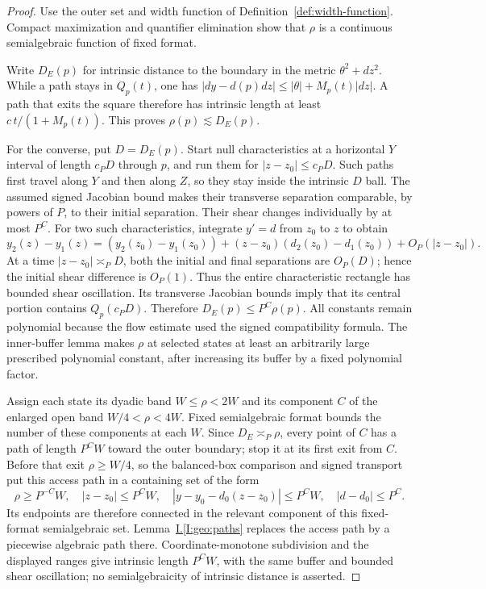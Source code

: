 \documentclass[11pt]{amsart}
\theoremstyle{definition}
\theoremstyle{remark}
\numberwithin{equation}{section}
\newcommand{\partIref}[1]{\hyperref[I:#1]{I.\ref*{I:#1}}}
\begin{document}
\begin{proof}
Use the outer set and width function of Definition~\ref{def:width-function}. Compact maximization and quantifier elimination show that $\rho$ is a continuous semialgebraic function of fixed format.

Write $D_E(p)$ for intrinsic distance to the boundary in the metric $\theta^2+dz^2$. While a path stays in $Q_p(t)$, one has $|dy-d(p)dz|\le |\theta|+M_p(t)|dz|$. A path that exits the square therefore has intrinsic length at least $c\,t/(1+M_p(t))$. This proves $\rho(p)\lesssim D_E(p)$.

For the converse, put $D=D_E(p)$. Start null characteristics at a horizontal $Y$ interval of length $c_PD$ through $p$, and run them for $|z-z_0|\le c_PD$. Such paths first travel along $Y$ and then along $Z$, so they stay inside the intrinsic $D$ ball. The assumed signed Jacobian bound makes their transverse separation comparable, by powers of $P$, to their initial separation. Their shear changes individually by at most $P^C$. For two such characteristics, integrate $y'=d$ from $z_0$ to $z$ to obtain
\[
y_2(z)-y_1(z)=(y_2(z_0)-y_1(z_0))+(z-z_0)(d_2(z_0)-d_1(z_0))+O_P(|z-z_0|).
\]
At a time $|z-z_0|\asymp_PD$, both the initial and final separations are $O_P(D)$; hence the initial shear difference is $O_P(1)$. Thus the entire characteristic rectangle has bounded shear oscillation. Its transverse Jacobian bounds imply that its central portion contains $Q_p(c_PD)$. Therefore $D_E(p)\le P^C\rho(p)$. All constants remain polynomial because the flow estimate used the signed compatibility formula. The inner-buffer lemma makes $\rho$ at selected states at least an arbitrarily large prescribed polynomial constant, after increasing its buffer by a fixed polynomial factor.

Assign each state its dyadic band $W\le\rho<2W$ and its component $C$ of the enlarged open band $W/4<\rho<4W$. Fixed semialgebraic format bounds the number of these components at each $W$. Since $D_E\asymp_P\rho$, every point of $C$ has a path of length $P^CW$ toward the outer boundary; stop it at its first exit from $C$. Before that exit $\rho\ge W/4$, so the balanced-box comparison and signed transport put this access path in a containing set of the form
\[
\rho\ge P^{-C}W,\quad |z-z_0|\le P^CW,\quad |y-y_0-d_0(z-z_0)|\le P^CW,\quad |d-d_0|\le P^C.
\]
Its endpoints are therefore connected in the relevant component of this fixed-format semialgebraic set. Lemma~\partIref{geo:paths} replaces the access path by a piecewise algebraic path there. Coordinate-monotone subdivision and the displayed ranges give intrinsic length $P^CW$, with the same buffer and bounded shear oscillation; no semialgebraicity of intrinsic distance is asserted.


\end{proof}
\end{document}
